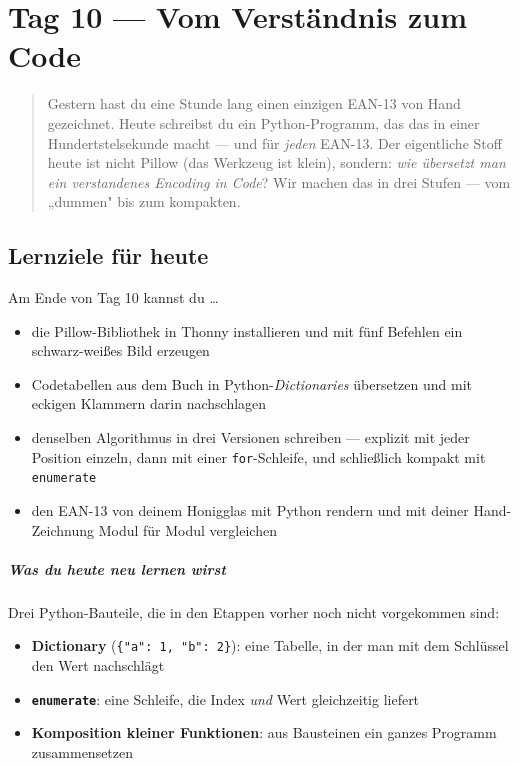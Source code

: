 \chapter{Tag 10 — Vom Verständnis zum Code}

\begin{quote}
Gestern hast du eine Stunde lang einen einzigen EAN-13 von Hand
gezeichnet. Heute schreibst du ein Python-Programm, das das in einer
Hundertstelsekunde macht — und für \emph{jeden} EAN-13. Der eigentliche
Stoff heute ist nicht Pillow (das Werkzeug ist klein), sondern: \emph{wie
übersetzt man ein verstandenes Encoding in Code}? Wir machen das in
drei Stufen — vom „dummen" bis zum kompakten.
\end{quote}

\section*{Lernziele für heute}

Am Ende von Tag 10 kannst du \dots

\begin{itemize}
\item die Pillow-Bibliothek in Thonny installieren und mit fünf
  Befehlen ein schwarz-weißes Bild erzeugen
\item Codetabellen aus dem Buch in Python-\emph{Dictionaries} übersetzen
  und mit eckigen Klammern darin nachschlagen
\item denselben Algorithmus in drei Versionen schreiben — explizit
  mit jeder Position einzeln, dann mit einer \texttt{for}-Schleife,
  und schließlich kompakt mit \texttt{enumerate}
\item den EAN-13 von deinem Honigglas mit Python rendern und mit
  deiner Hand-Zeichnung Modul für Modul vergleichen
\end{itemize}

\paragraph{Was du heute neu lernen wirst}
Drei Python-Bauteile, die in den Etappen vorher noch nicht
vorgekommen sind:

\begin{itemize}
\item \textbf{Dictionary} (\texttt{\{"a": 1, "b": 2\}}): eine
  Tabelle, in der man mit dem Schlüssel den Wert nachschlägt
\item \textbf{\texttt{enumerate}}: eine Schleife, die Index
  \emph{und} Wert gleichzeitig liefert
\item \textbf{Komposition kleiner Funktionen}: aus Bausteinen ein
  ganzes Programm zusammensetzen
\end{itemize}

